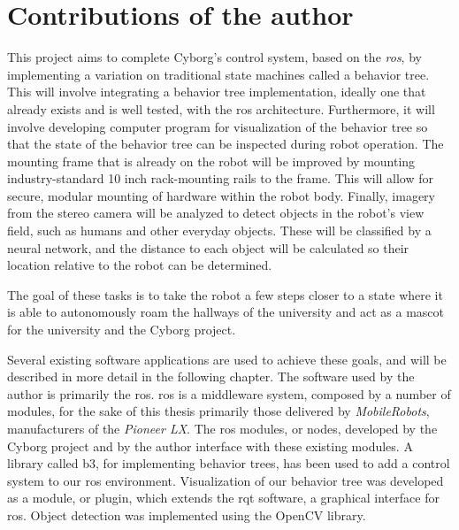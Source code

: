 \documentclass[\rootfolder/main.tex]{subfiles}
\begin{document}
\section{Contributions of the author}

This project aims to complete Cyborg's control system, based on the \emph{\acrfull{ros}}, by implementing a variation on traditional state machines called a behavior tree.
This will involve integrating a behavior tree implementation, ideally one that already exists and is well tested, with the \acrshort{ros} architecture.
Furthermore, it will involve developing computer program for visualization of the behavior tree so that the state of the behavior tree can be inspected during robot operation.
The mounting frame that is already on the robot will be improved by mounting industry-standard 10 inch rack-mounting rails to the frame.
This will allow for secure, modular mounting of hardware within the robot body.
Finally, imagery from the stereo camera will be analyzed to detect objects in the robot's view field, such as humans and other everyday objects.
These will be classified by a neural network, and the distance to each object will be calculated so their location relative to the robot can be determined.

The goal of these tasks is to take the robot a few steps closer to a state where it is able to autonomously roam the hallways of the university and act as a mascot for the university and the Cyborg project.

Several existing software applications are used to achieve these goals, and will be described in more detail in the following chapter.
The software used by the author is primarily the \acrlong{ros}.
\acrshort{ros} is a middleware system, composed by a number of modules, for the sake of this thesis primarily those delivered by \emph{MobileRobots}, manufacturers of the \emph{Pioneer LX}.
The \acrshort{ros} modules, or nodes, developed by the Cyborg project and by the author interface with these existing modules.
A library called b3, for implementing behavior trees, has been used to add a control system to our \acrshort{ros} environment.
Visualization of our behavior tree was developed as a module, or plugin, which extends the rqt software, a graphical interface for \acrshort{ros}.
Object detection was implemented using the OpenCV library.
\end{document}
